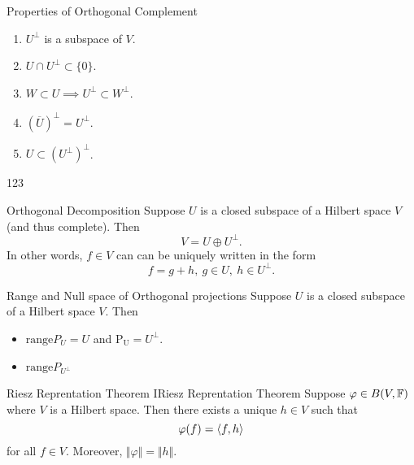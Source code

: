 \begin{stheorem}{Properties of Orthogonal Complement}{}
\begin{enumerate}
	\item $U^\perp$ is a subspace of $V$.
	\item $U \cap U^\perp \subset \{0\}$.
	\item $W \subset U \implies U^\perp \subset W^\perp$.
	\item $(\overline U)^\perp=U^\perp$.
	\item $U \subset (U^\perp)^\perp$.
\end{enumerate}
\end{stheorem}
\begin{Proof}
123
\end{Proof}

\begin{stheorem}{Orthogonal Decomposition}{}
Suppose $U$ is a closed subspace of a Hilbert space $V$(and thus complete). Then 
$$
V = U \oplus U^\perp.
$$
In other words, $f\in V$ can can be uniquely written in the form
$$
f = g + h, \ g \in U,\ h \in U^\perp. 
$$
\end{stheorem}
\begin{stheorem}{Range and Null space of Orthogonal projections}{}
Suppose $U$ is a closed subspace of a Hilbert space $V$. Then
\begin{itemize}
	\item $\mathrm{range}P_U=U$ and $\mathrm{P_U}=U^\perp$.
	\item $\mathrm{range}P_{U^\perp} $
\end{itemize}

\end{stheorem}
\begin{stheorem}{Riesz Reprentation Theorem I}{Riesz Reprentation Theorem}
Suppose $\varphi \in B(V,\mathbb{F})$ where $V$ is a Hilbert space. Then there exists a unique $h \in V$ such that 
$$
\varphi(f) = {\langle f,h\rangle}
$$
for all $f \in V$. Moreover, $\Vert \varphi \Vert = \Vert h \Vert$.
\end{stheorem}
